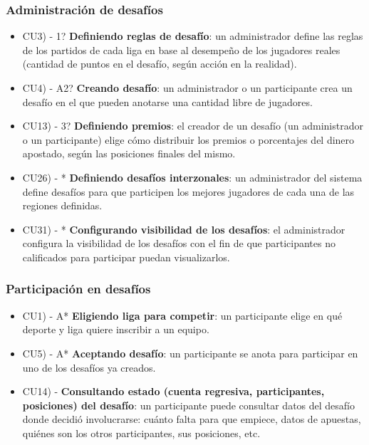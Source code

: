 \subsubsection{Administración de desafíos}
\begin{itemize}
\item CU3) - 1? \textbf{Definiendo reglas de desafío}: un administrador define las reglas de los partidos de cada liga en base al desempeño de los jugadores reales (cantidad de puntos en el desafío, según acción en la realidad).

\item CU4) - A2? \textbf{Creando desafío}: un administrador o un participante crea un desafío en el que pueden anotarse una cantidad libre de jugadores.

\item CU13) - 3? \textbf{Definiendo premios}: el creador de un desafío (un administrador o un participante) elige cómo distribuir los premios o porcentajes del dinero apostado, según las posiciones finales del mismo.

\item CU26) - * \textbf{Definiendo desafíos interzonales}: un administrador del sistema define desafíos para que participen los mejores jugadores de cada una de las regiones definidas.

\item CU31) - * \textbf{Configurando visibilidad de los desafíos}: el administrador configura la visibilidad de los desafíos con el fin de que participantes no calificados para participar puedan visualizarlos.
\end{itemize}

\subsubsection{Participación en desafíos}

\begin{itemize}
\item CU1) - A* \textbf{Eligiendo liga para competir}: un participante elige en qué deporte y liga quiere inscribir a un equipo.

\item CU5) - A* \textbf{Aceptando desafío}: un participante se anota para participar en uno de los desafíos ya creados.

\item CU14) - \textbf{Consultando estado (cuenta regresiva, participantes, posiciones) del desafío}: un participante puede consultar datos del desafío donde decidió involucrarse: cuánto falta para que empiece, datos de apuestas, quiénes son los otros participantes, sus posiciones, etc.
\end{itemize}



